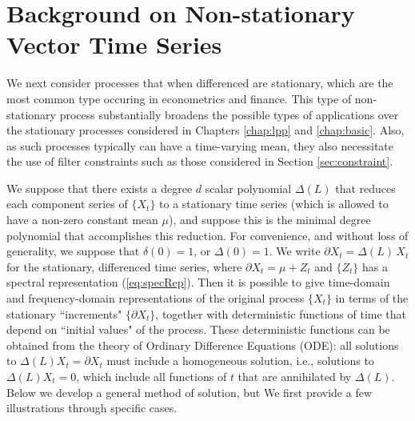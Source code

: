 \documentclass[a4paper]{book}
\begin{document}
  



\section{Background on Non-stationary Vector Time Series }
\label{sec:non-stat}

We next consider processes that when differenced are 
stationary, which are the most common type occuring in econometrics and finance.  
 This type of non-stationary process substantially broadens
  the possible types of applications over the stationary processes
   considered in Chapters \ref{chap:lpp} and \ref{chap:basic}.
  Also, as such processes typically can have a time-varying mean,
  they also necessitate the use of filter constraints such as those
   considered in Section \ref{sec:constraint}.
  
 We suppose that there exists a degree $d$ scalar polynomial $\Delta (L)$
  that reduces each component series of $\{ X_t \}$ to a stationary
   time series (which is allowed to have a non-zero constant mean $\mu$),
   and suppose this is the minimal degree polynomial that accomplishes
    this reduction.  For convenience, and without loss of generality,
    we suppose that $\delta (0) = 1$, or $\Delta (0) = 1$.
    We write $\partial X_t = \Delta (L) \, X_t$ for
  the stationary, differenced time series,
   where $\partial X_t = \mu + Z_t$ and $\{ Z_t \}$ has a spectral
    representation (\ref{eq:specRep}).  Then it is possible
   to give time-domain and frequency-domain representations of
    the original process $\{ X_t \}$ in terms of the stationary
  ``increments" $\{ \partial X_t \}$, together with deterministic functions
  of time that depend on ``initial values" of the process.
   These deterministic functions can be obtained from 
   the theory of Ordinary Difference Equations (ODE): 
  all solutions to   $\Delta (L) X_t = \partial X_t$
   must include a homogeneous solution, i.e., solutions to
    $\Delta (L) X_t = 0$,   which include all functions of 
    $t$ that are annihilated by $\Delta (L)$.  Below we develop
  a general method of solution, but We first provide a few
   illustrations through specific cases.
 
\end{document}
